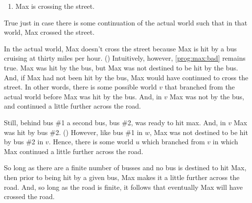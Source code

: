 \begin{note}
  \begin{enumerate}
  \item
    \label{prog:max:bad}
    Max is crossing the street.
  \end{enumerate}
  True just in case there is some continuation of the actual world such that in that world, Max crossed the street.

  In the actual world, Max doesn't cross the street because Max is hit by a bus cruising at thirty miles per hour.
  (\citeyear[764]{Portner:1998um})
  Intuitively, however, \ref{prog:max:bad} remains true.
  Max was hit by the bus, but Max was not destined to be hit by the bus.
  And, if Max had not been hit by the bus, Max would have continued to cross the street.
  In other words, there is some possible world \(v\) that branched from the actual world before Max was hit by the bus.
  And, in \(v\) Max was not by the bus, and continued a little further across the road.

  Still, behind bus \#1 a second bus, bus \#2, was ready to hit max.
  And, in \(v\) Max was hit by bus \#2.
  (\citeyear[766]{Portner:1998um})
  However, like bus \#1 in \(w\), Max was not destined to be hit by bus \#2 in \(v\).
  Hence, there is some world \(u\) which branched from \(v\) in which Max continued a little further across the road.

  So long as there are a finite number of busses and no bus is destined to hit Max, then prior to being hit by a given bus, Max makes it a little further across the road.
  And, so long as the road is finite, it follows that eventually Max will have crossed the road.
\end{note}

